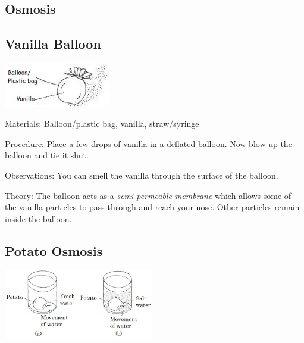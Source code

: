 \begin{multicols}{2}
\columnbreak


\section*{Osmosis} 


\subsection{Vanilla Balloon}

\begin{center}
\includegraphics[width=0.35\textwidth]{./img/vso/osmosis-vanilla.jpg}
\end{center}

\begin{description*}
\item[Materials:]{Balloon/plastic bag, vanilla, straw/syringe}
\item[Procedure:]{Place a few drops of vanilla in a deflated balloon. Now blow up the balloon and tie it shut.}
\item[Observations:]{You can smell the vanilla through the surface of the balloon.}
\item[Theory:]{The balloon acts as a \emph{semi-permeable membrane} which allows some of the vanilla particles to pass through and reach your nose. Other particles remain inside the balloon.}
\end{description*}

\subsection{Potato Osmosis}

\begin{center}
\includegraphics[width=0.49\textwidth]{./img/vso/osmosis-potato-full.jpg}
\end{center}


\end{multicols}
